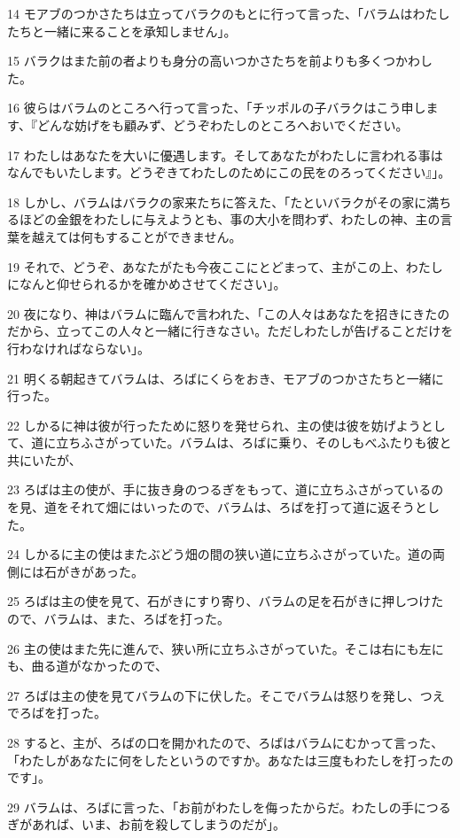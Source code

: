 \par 14 モアブのつかさたちは立ってバラクのもとに行って言った、「バラムはわたしたちと一緒に来ることを承知しません」。
\par 15 バラクはまた前の者よりも身分の高いつかさたちを前よりも多くつかわした。
\par 16 彼らはバラムのところへ行って言った、「チッポルの子バラクはこう申します、『どんな妨げをも顧みず、どうぞわたしのところへおいでください。
\par 17 わたしはあなたを大いに優遇します。そしてあなたがわたしに言われる事はなんでもいたします。どうぞきてわたしのためにこの民をのろってください』」。
\par 18 しかし、バラムはバラクの家来たちに答えた、「たといバラクがその家に満ちるほどの金銀をわたしに与えようとも、事の大小を問わず、わたしの神、主の言葉を越えては何もすることができません。
\par 19 それで、どうぞ、あなたがたも今夜ここにとどまって、主がこの上、わたしになんと仰せられるかを確かめさせてください」。
\par 20 夜になり、神はバラムに臨んで言われた、「この人々はあなたを招きにきたのだから、立ってこの人々と一緒に行きなさい。ただしわたしが告げることだけを行わなければならない」。
\par 21 明くる朝起きてバラムは、ろばにくらをおき、モアブのつかさたちと一緒に行った。
\par 22 しかるに神は彼が行ったために怒りを発せられ、主の使は彼を妨げようとして、道に立ちふさがっていた。バラムは、ろばに乗り、そのしもべふたりも彼と共にいたが、
\par 23 ろばは主の使が、手に抜き身のつるぎをもって、道に立ちふさがっているのを見、道をそれて畑にはいったので、バラムは、ろばを打って道に返そうとした。
\par 24 しかるに主の使はまたぶどう畑の間の狭い道に立ちふさがっていた。道の両側には石がきがあった。
\par 25 ろばは主の使を見て、石がきにすり寄り、バラムの足を石がきに押しつけたので、バラムは、また、ろばを打った。
\par 26 主の使はまた先に進んで、狭い所に立ちふさがっていた。そこは右にも左にも、曲る道がなかったので、
\par 27 ろばは主の使を見てバラムの下に伏した。そこでバラムは怒りを発し、つえでろばを打った。
\par 28 すると、主が、ろばの口を開かれたので、ろばはバラムにむかって言った、「わたしがあなたに何をしたというのですか。あなたは三度もわたしを打ったのです」。
\par 29 バラムは、ろばに言った、「お前がわたしを侮ったからだ。わたしの手につるぎがあれば、いま、お前を殺してしまうのだが」。
